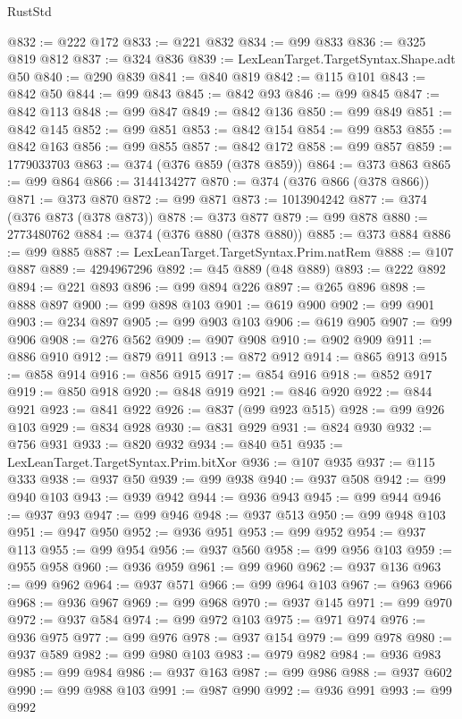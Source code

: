 \begin{lexlean}{RustStd}
\begin{coremodule}
@832 := @222 @172
@833 := @221 @832
@834 := @99 @833
@836 := @325 @819 @812
@837 := @324 @836
@839 := LexLeanTarget.TargetSyntax.Shape.adt @50
@840 := @290 @839
@841 := @840 @819
@842 := @115 @101
@843 := @842 @50
@844 := @99 @843
@845 := @842 @93
@846 := @99 @845
@847 := @842 @113
@848 := @99 @847
@849 := @842 @136
@850 := @99 @849
@851 := @842 @145
@852 := @99 @851
@853 := @842 @154
@854 := @99 @853
@855 := @842 @163
@856 := @99 @855
@857 := @842 @172
@858 := @99 @857
@859 := 1779033703
@863 := @374 (@376 @859 (@378 @859))
@864 := @373 @863
@865 := @99 @864
@866 := 3144134277
@870 := @374 (@376 @866 (@378 @866))
@871 := @373 @870
@872 := @99 @871
@873 := 1013904242
@877 := @374 (@376 @873 (@378 @873))
@878 := @373 @877
@879 := @99 @878
@880 := 2773480762
@884 := @374 (@376 @880 (@378 @880))
@885 := @373 @884
@886 := @99 @885
@887 := LexLeanTarget.TargetSyntax.Prim.natRem
@888 := @107 @887
@889 := 4294967296
@892 := @45 @889 (@48 @889)
@893 := @222 @892
@894 := @221 @893
@896 := @99 @894 @226
@897 := @265 @896
@898 := @888 @897
@900 := @99 @898 @103
@901 := @619 @900
@902 := @99 @901
@903 := @234 @897
@905 := @99 @903 @103
@906 := @619 @905
@907 := @99 @906
@908 := @276 @562
@909 := @907 @908
@910 := @902 @909
@911 := @886 @910
@912 := @879 @911
@913 := @872 @912
@914 := @865 @913
@915 := @858 @914
@916 := @856 @915
@917 := @854 @916
@918 := @852 @917
@919 := @850 @918
@920 := @848 @919
@921 := @846 @920
@922 := @844 @921
@923 := @841 @922
@926 := @837 (@99 @923 @515)
@928 := @99 @926 @103
@929 := @834 @928
@930 := @831 @929
@931 := @824 @930
@932 := @756 @931
@933 := @820 @932
@934 := @840 @51
@935 := LexLeanTarget.TargetSyntax.Prim.bitXor
@936 := @107 @935
@937 := @115 @333
@938 := @937 @50
@939 := @99 @938
@940 := @937 @508
@942 := @99 @940 @103
@943 := @939 @942
@944 := @936 @943
@945 := @99 @944
@946 := @937 @93
@947 := @99 @946
@948 := @937 @513
@950 := @99 @948 @103
@951 := @947 @950
@952 := @936 @951
@953 := @99 @952
@954 := @937 @113
@955 := @99 @954
@956 := @937 @560
@958 := @99 @956 @103
@959 := @955 @958
@960 := @936 @959
@961 := @99 @960
@962 := @937 @136
@963 := @99 @962
@964 := @937 @571
@966 := @99 @964 @103
@967 := @963 @966
@968 := @936 @967
@969 := @99 @968
@970 := @937 @145
@971 := @99 @970
@972 := @937 @584
@974 := @99 @972 @103
@975 := @971 @974
@976 := @936 @975
@977 := @99 @976
@978 := @937 @154
@979 := @99 @978
@980 := @937 @589
@982 := @99 @980 @103
@983 := @979 @982
@984 := @936 @983
@985 := @99 @984
@986 := @937 @163
@987 := @99 @986
@988 := @937 @602
@990 := @99 @988 @103
@991 := @987 @990
@992 := @936 @991
@993 := @99 @992

\end{coremodule}
\end{lexlean}
